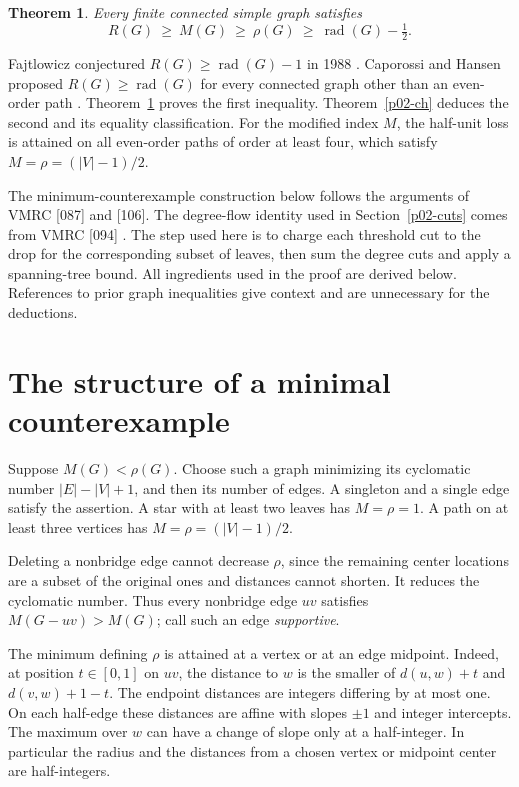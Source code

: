 \documentclass[11pt,a4paper]{article}
\newtheorem{theorem}{Theorem}[section]
\newcommand{\rad}{\operatorname{rad}}\newcommand{\diam}{\operatorname{diam}}
\begin{document}
\begin{theorem}\label{p02-main}
Every finite connected simple graph satisfies
\[
 R(G)\ \ge\ M(G)\ \ge\ \rho(G)\ \ge\ \rad(G)-\tfrac12.
\]
\end{theorem}

Fajtlowicz conjectured $R(G)\ge\rad(G)-1$ in 1988 \cite{p02-Faj,p02-Deng}.
Caporossi and Hansen proposed $R(G)\ge\rad(G)$ for every connected
graph other than an even-order path \cite{p02-CH,p02-Deng,p02-CPS}.
Theorem~\ref{p02-main} proves the first inequality. Theorem~\ref{p02-ch}
deduces the second and its equality classification. For the modified index
$M$, the half-unit loss is attained on all even-order paths of order at
least four, which satisfy $M=\rho=(|V|-1)/2$.

The minimum-counterexample construction below follows the arguments of
VMRC [087] and [106]. The degree-flow identity used in Section~\ref{p02-cuts}
comes from VMRC [094] \cite{p02-VMRC}. The step used here is to charge each threshold
cut to the drop for the corresponding subset of leaves, then sum the
degree cuts and apply a spanning-tree bound. All ingredients used in the
proof are derived below. References to prior graph inequalities give
context and are unnecessary for the deductions.

\section{The structure of a minimal counterexample}
Suppose $M(G)<\rho(G)$. Choose such a graph minimizing its cyclomatic
number $|E|-|V|+1$, and then its number of edges. A singleton and a
single edge satisfy the assertion. A star with at least two leaves has
$M=\rho=1$. A path on at least three vertices has $M=\rho=(|V|-1)/2$.

Deleting a nonbridge edge cannot decrease $\rho$, since the remaining
center locations are a subset of the original ones and distances cannot
shorten. It reduces the cyclomatic number. Thus every nonbridge edge $uv$
satisfies $M(G-uv)>M(G)$; call such an edge \emph{supportive}.

The minimum defining $\rho$ is attained at a vertex or at an edge midpoint.
Indeed, at position $t\in[0,1]$ on $uv$, the distance to $w$ is the smaller
of $d(u,w)+t$ and $d(v,w)+1-t$. The endpoint distances are integers
differing by at most one. On each half-edge these distances are affine
with slopes $\pm1$ and integer intercepts. The maximum over $w$ can have
a change of slope only at a half-integer. In particular the radius and
the distances from a chosen vertex or midpoint center are half-integers.
\end{document}
